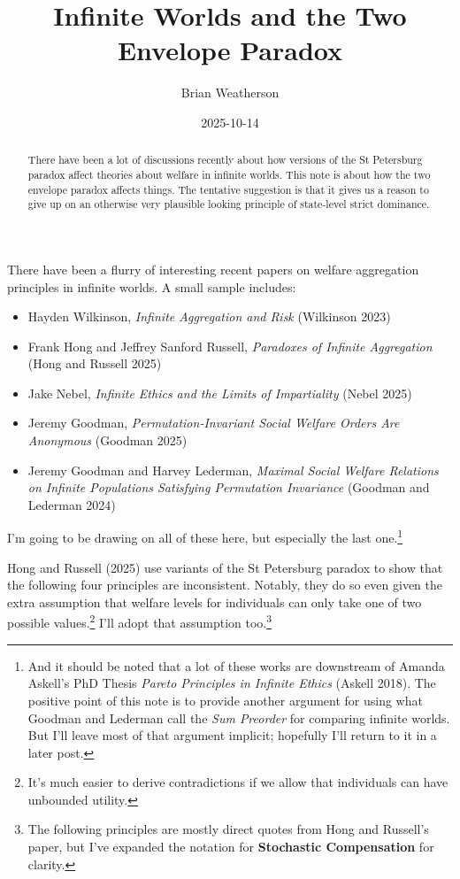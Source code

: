 \documentclass[
  letterpaper,
  DIV=11,
  numbers=noendperiod]{scrartcl}
\title{Infinite Worlds and the Two Envelope Paradox}
\author{Brian Weatherson}
\date{2025-10-14}
\providecommand{\tightlist}{%
  \setlength{\itemsep}{0pt}\setlength{\parskip}{0pt}}
\begin{document}
\maketitle
\begin{abstract}
There have been a lot of discussions recently about how versions of the
St Petersburg paradox affect theories about welfare in infinite worlds.
This note is about how the two envelope paradox affects things. The
tentative suggestion is that it gives us a reason to give up on an
otherwise very plausible looking principle of state-level strict
dominance.
\end{abstract}


There have been a flurry of interesting recent papers on welfare
aggregation principles in infinite worlds. A small sample includes:

\begin{itemize}
\tightlist
\item
  Hayden Wilkinson, \emph{Infinite Aggregation and Risk} (Wilkinson
  2023)
\item
  Frank Hong and Jeffrey Sanford Russell, \emph{Paradoxes of Infinite
  Aggregation} (Hong and Russell 2025)
\item
  Jake Nebel, \emph{Infinite Ethics and the Limits of Impartiality}
  (Nebel 2025)
\item
  Jeremy Goodman, \emph{Permutation-Invariant Social Welfare Orders Are
  Anonymous} (Goodman 2025)
\item
  Jeremy Goodman and Harvey Lederman, \emph{Maximal Social Welfare
  Relations on Infinite Populations Satisfying Permutation Invariance}
  (Goodman and Lederman 2024)
\end{itemize}

I'm going to be drawing on all of these here, but especially the last
one.\footnote{And it should be noted that a lot of these works are
  downstream of Amanda Askell's PhD Thesis \emph{Pareto Principles in
  Infinite Ethics} (Askell 2018). The positive point of this note is to
  provide another argument for using what Goodman and Lederman call the
  \emph{Sum Preorder} for comparing infinite worlds. But I'll leave most
  of that argument implicit; hopefully I'll return to it in a later
  post.}

Hong and Russell (2025) use variants of the St Petersburg paradox to
show that the following four principles are inconsistent. Notably, they
do so even given the extra assumption that welfare levels for
individuals can only take one of two possible values.\footnote{It's much
  easier to derive contradictions if we allow that individuals can have
  unbounded utility.} I'll adopt that assumption too.\footnote{The
  following principles are mostly direct quotes from Hong and Russell's
  paper, but I've expanded the notation for \textbf{Stochastic
  Compensation} for clarity.}
\end{document}
